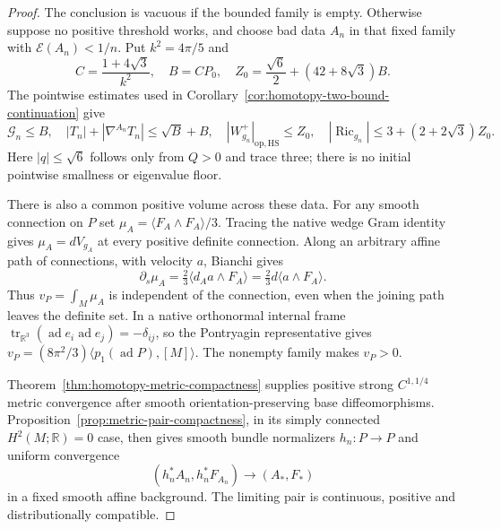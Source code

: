 \documentclass[11pt]{article}
\numberwithin{equation}{section}
\theoremstyle{definition}
\theoremstyle{remark}
\DeclareMathOperator{\Ric}{Ric}
\DeclareMathOperator{\tr}{tr}
\newcommand{\R}{\mathbb R}
\begin{document}
\begin{proof}
The conclusion is vacuous if the bounded family is empty.
Otherwise suppose no positive threshold works, and choose
bad data $A_n$ in that fixed family with
$\mathscr E(A_n)<1/n$. Put $k^2=4\pi/5$ and
\[
 C=\frac{1+4\sqrt3}{k^2},\quad B=CP_0,\quad
 Z_0=\frac{\sqrt6}{2}+(42+8\sqrt3)B.
\]
The pointwise estimates used in
Corollary~\ref{cor:homotopy-two-bound-continuation} give
\[
 \mathcal G_n\le B,\quad
 |T_n|+|\nabla^{A_n}T_n|\le\sqrt B+B,\quad
 |W^+_{g_n}|_{\mathrm{op,HS}}\le Z_0,\quad
 |\Ric_{g_n}|\le3+(2+2\sqrt3)Z_0.
\]
Here $|q|\le\sqrt6$ follows only from $Q>0$ and trace three;
there is no initial pointwise smallness or eigenvalue floor.

There is also a common positive volume across these data.
For any smooth connection on $P$ set
$\mu_A=\langle F_A\wedge F_A\rangle/3$.
Tracing the native wedge Gram identity gives
$\mu_A=dV_{g_A}$ at every positive definite connection.
Along an arbitrary affine path of connections, with velocity
$a$, Bianchi gives
\begin{equation}\label{eq:native-common-volume}
 \partial_s\mu_A=\tfrac23\langle d_Aa\wedge F_A\rangle
                  =\tfrac23d\langle a\wedge F_A\rangle.
\end{equation}
Thus $v_P=\int_M\mu_A$ is independent of the connection,
even when the joining path leaves the definite set. In a
native orthonormal internal frame
$\tr_{\R^3}(\operatorname{ad}e_i\operatorname{ad}e_j)
=-\delta_{ij}$, so the Pontryagin representative gives
$v_P=(8\pi^2/3)\langle p_1(\operatorname{ad}P),[M]\rangle$.
The nonempty family makes $v_P>0$.

Theorem~\ref{thm:homotopy-metric-compactness} supplies positive
strong $C^{1,1/4}$ metric convergence after smooth
orientation-preserving base diffeomorphisms.
Proposition~\ref{prop:metric-pair-compactness}, in its simply
connected $H^2(M;\R)=0$ case, then gives smooth bundle
normalizers $h_n:P\to P$ and uniform convergence
\[
 (h_n^*A_n,h_n^*F_{A_n})\longrightarrow(A_*,F_*)
\]
in a fixed smooth affine background. The limiting pair is
continuous, positive and distributionally compatible.


\end{proof}
\end{document}
